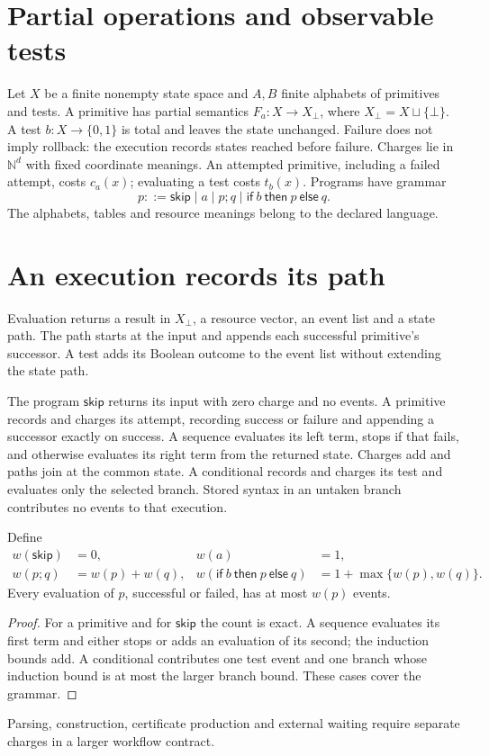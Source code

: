 \section{Partial operations and observable tests}
Let $X$ be a finite nonempty state space and $A,B$ finite alphabets of primitives and tests. A primitive has partial semantics $F_a:X\to X_\bot$, where $X_\bot=X\sqcup\{\bot\}$. A test $b:X\to\{0,1\}$ is total and leaves the state unchanged. Failure does not imply rollback: the execution records states reached before failure.
Charges lie in $\mathbb N^d$ with fixed coordinate meanings. An attempted primitive, including a failed attempt, costs $c_a(x)$; evaluating a test costs $t_b(x)$. Programs have grammar
\[
p::=\mathsf{skip}\mid a\mid p;q\mid\mathsf{if}\ b\ \mathsf{then}\ p\ \mathsf{else}\ q.
\]
The alphabets, tables and resource meanings belong to the declared language.

\section{An execution records its path}
Evaluation returns a result in $X_\bot$, a resource vector, an event list and a state path. The path starts at the input and appends each successful primitive's successor. A test adds its Boolean outcome to the event list without extending the state path.

The program $\mathsf{skip}$ returns its input with zero charge and no events. A primitive records and charges its attempt, recording success or failure and appending a successor exactly on success. A sequence evaluates its left term, stops if that fails, and otherwise evaluates its right term from the returned state. Charges add and paths join at the common state. A conditional records and charges its test and evaluates only the selected branch. Stored syntax in an untaken branch contributes no events to that execution.

\begin{Coreproposition}
Define
\begin{align*}
w(\mathsf{skip})&=0,&w(a)&=1,\\
w(p;q)&=w(p)+w(q),&w(\mathsf{if}\ b\ \mathsf{then}\ p\ \mathsf{else}\ q)&=1+\max\{w(p),w(q)\}.
\end{align*}
Every evaluation of $p$, successful or failed, has at most $w(p)$ events.
\end{Coreproposition}
\begin{proof}
For a primitive and for $\mathsf{skip}$ the count is exact. A sequence evaluates its first term and either stops or adds an evaluation of its second; the induction bounds add. A conditional contributes one test event and one branch whose induction bound is at most the larger branch bound. These cases cover the grammar.
\end{proof}
Parsing, construction, certificate production and external waiting require separate charges in a larger workflow contract.


